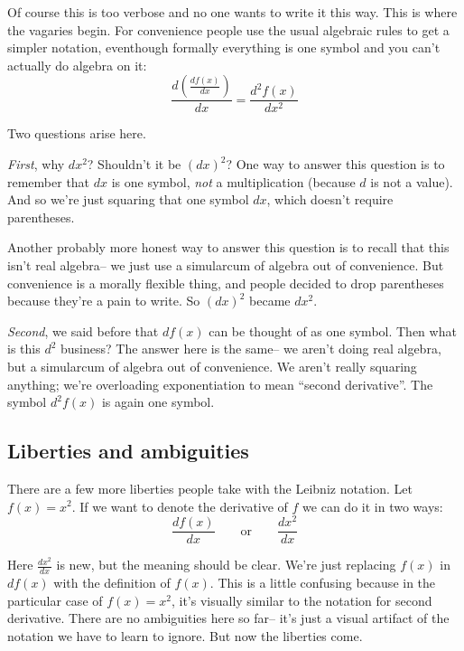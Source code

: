 Of course this is too verbose and no one wants to write it this way.
This is where the vagaries begin. For convenience people use the usual
algebraic rules to get a simpler notation, eventhough formally
everything is one symbol and you can't actually do algebra on it:
\[\frac{d\left(\frac{df(x)}{dx}\right)}{dx}=\frac{d^2f(x)}{dx^2}\]

Two questions arise here.

\vs

\textit{First}, why $dx^2$? Shouldn't it be $(dx)^2$? One way to
answer this question is to remember that $dx$ is one symbol, \textit{not} a
multiplication (because $d$ is not a value). And so we're just
squaring that one symbol $dx$, which doesn't require parentheses.

\vs

Another probably more honest way to answer this question is to recall
that this isn't real algebra-- we just use a simularcum of algebra out
of convenience. But convenience is a morally flexible thing, and
people decided to drop parentheses because they're a pain to write. So
$(dx)^2$ became $dx^2$.

\vs

\textit{Second}, we said before that $df(x)$ can be thought of as one
symbol. Then what is this $d^2$ business? The answer here is the same--
we aren't doing real algebra, but a simularcum of algebra out of
convenience. We aren't really squaring anything; we're overloading
exponentiation to mean ``second derivative''. The symbol $d^2f(x)$ is
again one symbol.

\subsection{Liberties and ambiguities}

There are a few more liberties people take with the Leibniz notation.
Let $f(x)=x^2$. If we want to denote the derivative of $f$ we can do
it in two ways:
\[\frac{df(x)}{dx} \qquad\text{or}\qquad \frac{dx^2}{dx}\]

Here $\frac{dx^2}{dx}$ is new, but the meaning should be clear. We're
just replacing $f(x)$ in $df(x)$ with the definition of $f(x)$. This
is a little confusing because in the particular case of $f(x)=x^2$,
it's visually similar to the notation for second derivative. There are
no ambiguities here so far-- it's just a visual artifact of the
notation we have to learn to ignore. But now the liberties come.

\vs

